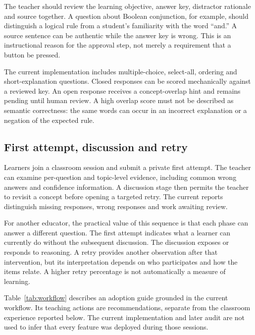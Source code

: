 The teacher should review the learning objective, answer key, distractor rationale and source together. A question about Boolean conjunction, for example, should distinguish a logical rule from a student's familiarity with the word ``and.'' A source sentence can be authentic while the answer key is wrong. This is an instructional reason for the approval step, not merely a requirement that a button be pressed.

The current implementation includes multiple-choice, select-all, ordering and short-explanation questions. Closed responses can be scored mechanically against a reviewed key. An open response receives a concept-overlap hint and remains pending until human review. A high overlap score must not be described as semantic correctness: the same words can occur in an incorrect explanation or a negation of the expected rule.

\subsection{First attempt, discussion and retry}
Learners join a classroom session and submit a private first attempt. The teacher can examine per-question and topic-level evidence, including common wrong answers and confidence information. A discussion stage then permits the teacher to revisit a concept before opening a targeted retry. The current reports distinguish missing responses, wrong responses and work awaiting review.

For another educator, the practical value of this sequence is that each phase can answer a different question. The first attempt indicates what a learner can currently do without the subsequent discussion. The discussion exposes or responds to reasoning. A retry provides another observation after that intervention, but its interpretation depends on who participates and how the items relate. A higher retry percentage is not automatically a measure of learning.

Table~\ref{tab:workflow} describes an adoption guide grounded in the current workflow. Its teaching actions are recommendations, separate from the classroom experience reported below. The current implementation and later audit are not used to infer that every feature was deployed during those sessions.

